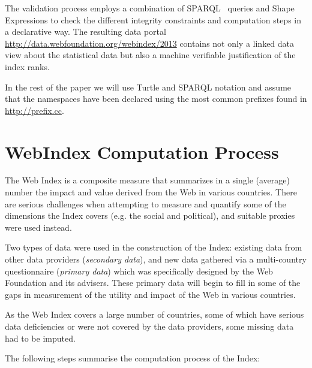 \documentclass{llncs}
\begin{document}
The validation process employs a combination of SPARQL~\cite{SPARQL11} queries and Shape Expressions \cite{Boneva2014} to check the 
 different integrity constraints and computation steps in a declarative way.
The resulting data portal \url{http://data.webfoundation.org/webindex/2013} contains not only a linked data view about the statistical data but also a machine verifiable justification of the index ranks.


In the rest of the paper we will use Turtle and SPARQL notation and assume that the namespaces have been declared using the most common prefixes found in
\url{http://prefix.cc}.

\section{WebIndex Computation Process}

The Web Index is a composite measure that summarizes in a single (average) number the impact and value derived from the Web in various countries. There are serious challenges when attempting to measure and quantify some of the dimensions the Index covers (e.g. the social and political), and suitable proxies were used instead.

Two types of data were used in the construction of the Index: existing data from other data providers (\emph{secondary data}), and new data gathered via a multi-country questionnaire (\emph{primary data}) 
which was specifically designed by the Web Foundation and its advisers. 
These primary data will begin to fill in some of the gaps in measurement of the utility and impact of the Web in various countries. 

As the Web Index covers a large number of countries, some of which have serious data deficiencies or were not covered by the data providers, some missing data had to be imputed.

The following steps summarise the computation process of the Index:
\end{document}
